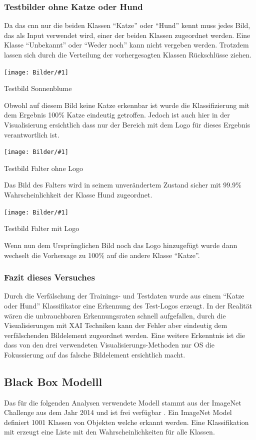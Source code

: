 \documentclass[
  12pt, %
  a4paper, %
  oneside, %
  openany, 
  numbers=noenddot, %
  BCOR=5mm, %
  parskip=half*, %
  thesis, %
]{bfhbook}
\newcommand{\imgText}[3]{
\begin{center}
    \begin{minipage}[t]{0.6\textwidth}
    		\vspace{0pt}
		\texttt{[image: Bilder/\#1]}
		\caption{#2}
	\end{minipage}\hfill
    \begin{minipage}[t]{0.4\textwidth}
    		\vspace{5pt}
  		#3
    \end{minipage}
\end{center}
}
\begin{document}
\subsubsection*{Testbilder ohne Katze oder Hund}
Da das \Gls{cnn} nur die beiden Klassen ``Katze'' oder ``Hund'' kennt muss jedes Bild, das als Input verwendet wird, einer der beiden Klassen zugeordnet werden. Eine Klasse ``Unbekannt'' oder ``Weder noch'' kann nicht vergeben werden. Trotzdem lassen sich durch die Verteilung der vorhergesagten Klassen Rückschlüsse ziehen.
\imgText{Manipulated_case_img1.png}{Testbild Sonnenblume}{
Obwohl auf diesem Bild keine Katze erkennbar ist wurde die Klassifizierung mit dem Ergebnis 100\% Katze eindeutig getroffen. Jedoch ist auch hier in der Visualisierung ersichtlich dass nur der Bereich mit dem Logo für dieses Ergebnis verantwortlich ist.
}
\imgText{Manipulated_case_img2.png}{Testbild Falter ohne Logo}{
Das Bild des Falters wird in seinem unverändertem Zustand sicher mit 99.9\% Wahrscheinlichkeit der Klasse Hund zugeordnet.
}
\imgText{Manipulated_case_img3.png}{Testbild Falter mit Logo}{
Wenn nun dem Ursprünglichen Bild noch das Logo hinzugefügt wurde dann wechselt die Vorhersage zu 100\% auf die andere Klasse ``Katze''.
}

\subsubsection*{Fazit dieses Versuches}
Durch die Verfälschung der Trainings- und Testdaten wurde aus einem ``Katze oder Hund'' Klassifikator eine Erkennung des Test-Logos erzeugt. In der Realität wären die unbrauchbaren Erkennungsraten schnell aufgefallen, durch die Visualisierungen mit \Gls{XAI} Techniken kann der Fehler aber eindeutig dem verfälschenden Bildelement zugeordnet werden.
\break 
Eine weitere Erkenntnis ist die dass von den drei verwendeten Visualisierungs-Methoden nur \Gls{OS} die Fokussierung auf das falsche Bildelement ersichtlich macht. 

\subsection{Black Box Modelll}

Das für die folgenden Analysen verwendete Modell stammt aus der ImageNet Challenge \parencite{imageNet} aus dem Jahr 2014 und ist frei verfügbar \parencite{Simonyan2014}. Ein ImageNet Model definiert 1001 Klassen von Objekten welche erkannt werden. Eine Klassifikation mit \parencite{TensorFlow} erzeugt eine Liste mit den Wahrscheinlichkeiten für alle Klassen. 
\end{document}
